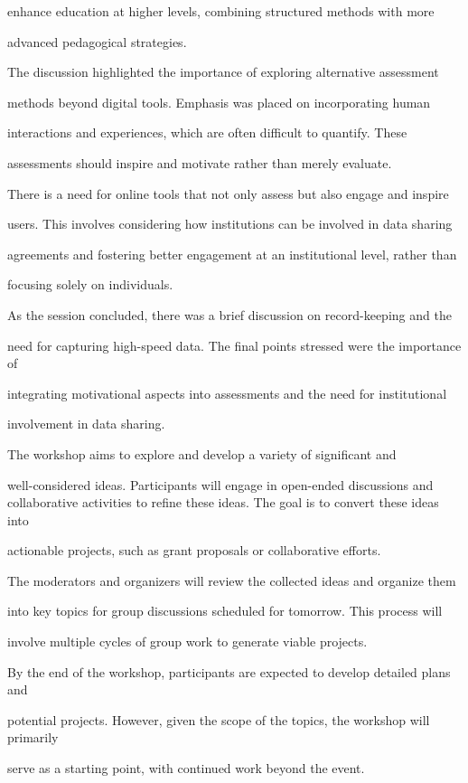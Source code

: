 \documentclass[11pt]{article}
\begin{document}
enhance education at higher levels, combining structured methods with more

advanced pedagogical strategies.

The discussion highlighted the importance of exploring alternative assessment

methods beyond digital tools. Emphasis was placed on incorporating human

interactions and experiences, which are often difficult to quantify. These

assessments should inspire and motivate rather than merely evaluate.

There is a need for online tools that not only assess but also engage and inspire

users. This involves considering how institutions can be involved in data sharing

agreements and fostering better engagement at an institutional level, rather than

focusing solely on individuals.

As the session concluded, there was a brief discussion on record-keeping and the

need for capturing high-speed data. The final points stressed were the importance of

integrating motivational aspects into assessments and the need for institutional

involvement in data sharing.

The workshop aims to explore and develop a variety of significant and

well-considered ideas. Participants will engage in open-ended discussions and collaborative activities to refine these ideas. The goal is to convert these ideas into

actionable projects, such as grant proposals or collaborative efforts.

The moderators and organizers will review the collected ideas and organize them

into key topics for group discussions scheduled for tomorrow. This process will

involve multiple cycles of group work to generate viable projects.

By the end of the workshop, participants are expected to develop detailed plans and

potential projects. However, given the scope of the topics, the workshop will primarily

serve as a starting point, with continued work beyond the event.
\end{document}

